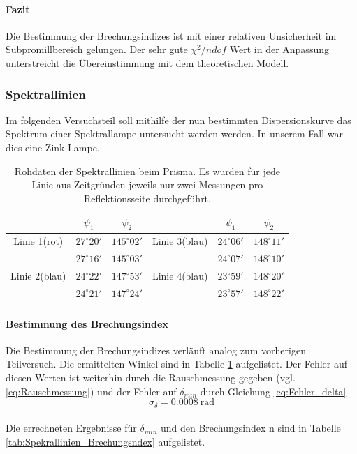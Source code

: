 \documentclass[12pt,a4paper]{article}
\begin{document}
\paragraph{Fazit}
Die Bestimmung der Brechungsindizes ist mit einer relativen Unsicherheit im Subpromillbereich gelungen. Der sehr gute $\chi^2/ndof$ Wert in der Anpassung unterstreicht die Übereinstimmung mit dem theoretischen Modell.

\subsubsection{Spektrallinien}
Im folgenden Versuchsteil soll mithilfe der nun bestimmten Dispersionskurve das Spektrum einer Spektrallampe untersucht werden werden. In unserem Fall war dies eine Zink-Lampe.
\begin{table}
\centering
\begin{tabular}{|c|c|c||c|c|c|}
\hline 
 & $\psi_1$ & $\psi_2$ & & $\psi_1$ & $\psi_2$ \\ 
\hline 
Linie 1(rot) & $27^\circ 20'$ & $145^\circ 02'$ & Linie 3(blau) & $24^\circ 06'$ & $148^\circ 11'$\\ 
\hline 
 & $27^\circ 16'$ & $145^\circ 03'$& & $24^\circ 07'$ & $148^\circ 10'$\\
\hline
\hline 
\hline 
Linie 2(blau) & $24^\circ 22'$ & $147^\circ 53'$ & Linie 4(blau) & $23^\circ 59'$ & $148^\circ 20'$\\ 
\hline 
 & $24^\circ 21'$ & $147^\circ 24'$&  & $23^\circ 57'$ & $148^\circ 22'$\\ 
\hline 
\end{tabular} 
\caption{Rohdaten der Spektrallinien beim Prisma. Es wurden für jede Linie aus Zeitgründen jeweils nur zwei Messungen pro Reflektionsseite durchgeführt.}
\label{tab:Spektrallinien_rohdaten}
\end{table}

\paragraph{Bestimmung des Brechungsindex}
Die Bestimmung der Brechungsindizes verläuft analog zum vorherigen Teilversuch. Die ermittelten Winkel sind in Tabelle \ref{tab:Spektrallinien_rohdaten} aufgelistet.
Der Fehler auf diesen Werten ist weiterhin durch die Rauschmessung gegeben (vgl. \ref{eq:Rauschmessung})
und der Fehler auf $\delta_{min}$ durch Gleichung \ref{eq:Fehler_delta}
\begin{equation}
\sigma_{\delta} = \SI{0.0008}{\radian}
\end{equation}\\
Die errechneten Ergebnisse für $\delta_{min}$ und den Brechungsindex n sind in Tabelle \ref{tab:Spekrallinien_Brechungsndex} aufgelistet.
\end{document}
